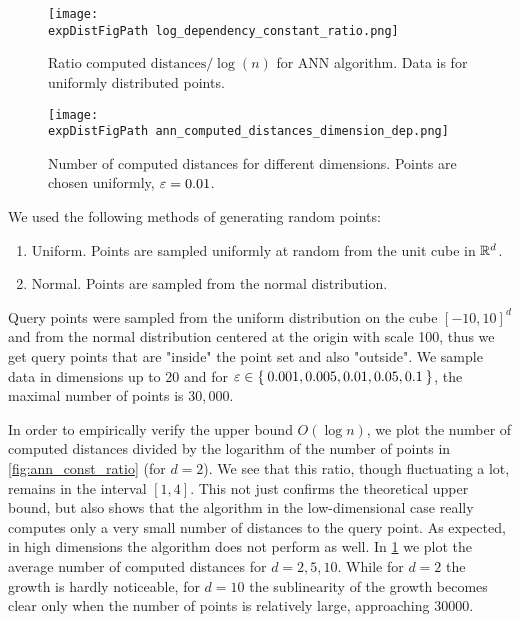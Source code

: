 \begin{figure}[ht]
    \begin{minipage}{0.45\textwidth}
        \texttt{[image: \\expDistFigPath log\_dependency\_constant\_ratio.png]}
        \caption{Ratio $\mbox{computed distances} / \log(n)$ for ANN algorithm. Data is for uniformly distributed
        points.}
        \label{fig:ann_const_ratio}
    \end{minipage}
    \begin{minipage}{0.45\textwidth}
        \texttt{[image: \\expDistFigPath ann\_computed\_distances\_dimension\_dep.png]}
        \caption{Number of computed distances for different dimensions. Points are chosen uniformly, $\varepsilon = 0.01$.}
        \label{fig:ann_dimension_dependence}
    \end{minipage}
\end{figure}


We used the following methods of generating random points:
\begin{enumerate}
    \item Uniform. Points are sampled uniformly at random from the unit cube in $\mathbb{R}^d$.
    \item Normal. Points are sampled from the normal distribution.
\end{enumerate}
Query points were sampled from the uniform distribution on the cube $[-10, 10]^d$
and from the normal distribution centered at the origin with scale 100,
thus we get query points that are "inside" the point set and also "outside".
We sample data in dimensions up to 20 and for $\varepsilon \in \Set{0.001, 0.005, 0.01, 0.05, 0.1}$,
the maximal number of points is $30,000$.

In order to empirically verify the upper bound $O(\log n)$,
we plot the number of computed distances divided
by the logarithm of the number of points in \cref{fig:ann_const_ratio} (for $d = 2$).
We see that this ratio, though fluctuating a lot, remains in the interval $[1,4]$. This not just confirms
the theoretical upper bound, but also shows that the algorithm in the low-dimensional case
really computes only a very small number of distances to the query point.
As expected, in high dimensions the algorithm does not perform as well.
In \cref{fig:ann_dimension_dependence} we plot the average number of computed distances
for $d = 2, 5, 10$. While for $d = 2$ the growth is hardly noticeable, for $d = 10$
the sublinearity of the growth becomes clear only when the number of points is relatively large,
approaching 30000.



